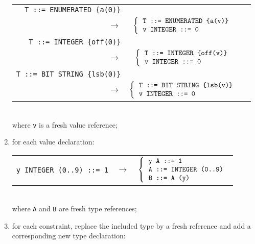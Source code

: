 \begin{enumerate}
        \begin{tabular}{rcl}
           \verb+T ::= ENUMERATED {a(0)}+\\
             $\longrightarrow$
           & $\left\{
                \begin{tabular}{l}
                  \verb+T ::= ENUMERATED {a(v)}+\\
                  \verb+v INTEGER ::= 0+
                \end{tabular}
              \right.$\\
            \verb+T ::= INTEGER {off(0)}+\\
              $\longrightarrow$
           & $\left\{
                \begin{tabular}{l}
                   \verb+T ::= INTEGER {off(v)}+\\
                   \verb+v INTEGER ::= 0+
                \end{tabular}
              \right.$\\
            \verb+T ::= BIT STRING {lsb(0)}+\\
              $\longrightarrow$
           & $\left\{
                \begin{tabular}{l} 
                   \verb+T ::= BIT STRING {lsb(v)}+\\
                   \verb+v INTEGER ::= 0+\\
                \end{tabular}
              \right.$
        \end{tabular} \\
        where \texttt{v} is a fresh value reference;

  \item for each value declaration:

        \begin{tabular}{rcl}
           \verb+y INTEGER (0..9) ::= 1+
           & $\longrightarrow$ 
           & $\left\{
                \begin{tabular}{l} 
                   \verb+y A ::= 1+ \\
                   \verb+A ::= INTEGER (0..9)+ \\
                   \verb+B ::= A (y)+
                \end{tabular}
              \right.$
        \end{tabular} \\
        where \verb+A+ and \verb+B+ are fresh type references;

  \item for each \kwdINCLUDES constraint, replace the included type by
        a fresh reference and add a corresponding new type
        declaration:


\end{enumerate}
